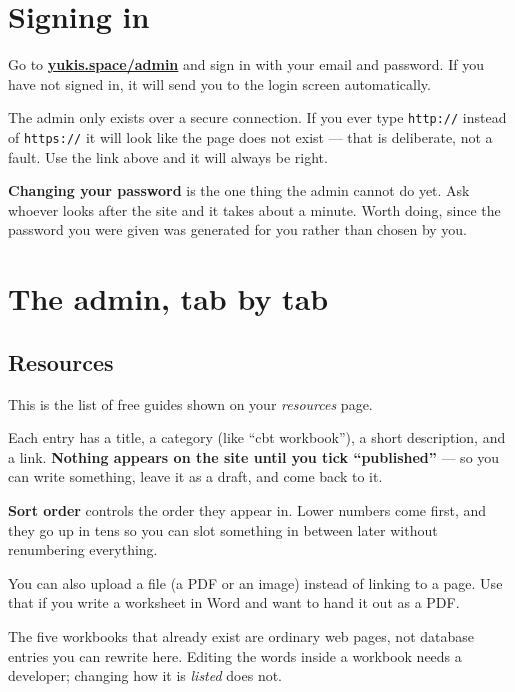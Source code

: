 \documentclass[11pt,a4paper]{article}
\newenvironment{callout}
  {\par\medskip\noindent\begin{list}{}{%
     \setlength{\leftmargin}{1.2em}\setlength{\rightmargin}{0pt}%
     \setlength{\labelwidth}{0pt}\setlength{\itemindent}{0pt}}%
   \item[]\color{ink}\hspace{-1.2em}%
   \makebox[0pt][l]{\raisebox{-0.35\baselineskip}[0pt][0pt]{%
     \textcolor{gold}{\rule{2pt}{1.15\baselineskip}}}}\hspace{1.2em}\ignorespaces}
  {\end{list}\medskip}
\newcommand{\lead}[1]{\textbf{\color{ink}#1}}
\newcommand{\code}[1]{\texttt{\small #1}}
\begin{document}
\section{Signing in}

Go to \href{https://yukis.space/admin}{\textbf{yukis.space/admin}} and sign in
with your email and password. If you have not signed in, it will send you to
the login screen automatically.

The admin only exists over a secure connection. If you ever type \code{http://}
instead of \code{https://} it will look like the page does not exist --- that
is deliberate, not a fault. Use the link above and it will always be right.

\begin{callout}
\lead{Changing your password} is the one thing the admin cannot do yet. Ask
whoever looks after the site and it takes about a minute. Worth doing, since
the password you were given was generated for you rather than chosen by you.
\end{callout}

\section{The admin, tab by tab}

\subsection{Resources}

This is the list of free guides shown on your \emph{resources} page.

Each entry has a title, a category (like ``cbt workbook''), a short
description, and a link. \textbf{Nothing appears on the site until you tick
``published''} --- so you can write something, leave it as a draft, and come
back to it.

\lead{Sort order} controls the order they appear in. Lower numbers come first,
and they go up in tens so you can slot something in between later without
renumbering everything.

You can also upload a file (a PDF or an image) instead of linking to a page.
Use that if you write a worksheet in Word and want to hand it out as a PDF.

The five workbooks that already exist are ordinary web pages, not database
entries you can rewrite here. Editing the words inside a workbook needs a
developer; changing how it is \emph{listed} does not.
\end{document}
